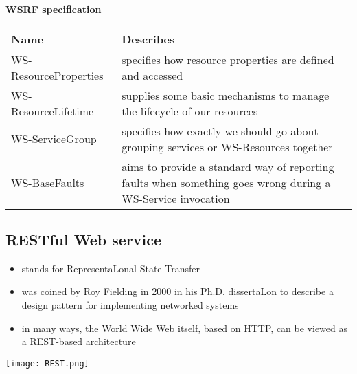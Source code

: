 \begin{center}
\textbf{WSRF specification}
{\scriptsize
\begin{Table}
\begin{tabular}{|K{.45\textwidth}|K{.45\textwidth}|}
\hline
\textbf{Name} & \textbf{Describes}\\[.4em]
\hline
WS-ResourceProperties &  specifies how resource properties are defined and accessed\\[.4em]
\hline
WS-ResourceLifetime & supplies some basic mechanisms to manage the lifecycle of our resources\\[.4em]
\hline
WS-ServiceGroup & specifies how exactly we should go about grouping services or WS-Resources together\\[.4em]
\hline
WS-BaseFaults & aims to provide a standard way of reporting faults when something goes wrong during a WS-Service invocation\\[.4em]
\hline
\end{tabular}
\label{tbl:WSPF}
\end{Table}
}
\end{center}

\subsection*{RESTful Web service}
\begin{itemize}
\item stands for \textcolor{g}{Re}presentaLonal \textcolor{g}{S}tate \textcolor{g}{T}ransfer
\item was coined by	Roy	Fielding in	2000 in his Ph.D. dissertaLon	to	describe a	design pattern for implementing networked systems
\item in many ways,	the	World Wide Web itself, based on HTTP, can be viewed as a REST-based architecture
\end{itemize}

\begin{Figure}
\centering
\texttt{[image: REST.png]}
\label{fig:SOAP}
\end{Figure}

